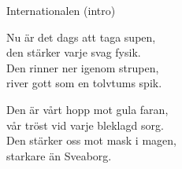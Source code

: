 \begin{song}{Internationalen (intro)}


	
	Nu är det dags att taga supen,\\
	den stärker varje svag fysik.\\
	Den rinner ner igenom strupen,\\
	river gott som en tolvtums spik.
	
	Den är vårt hopp mot gula faran,\\
	vår tröst vid varje bleklagd sorg.\\
	Den stärker oss mot mask i magen,\\
	starkare än Sveaborg.
	
\end{song}
